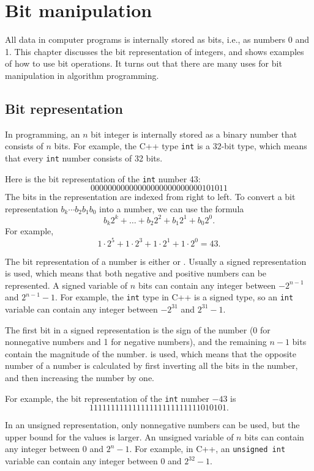\chapter{Bit manipulation}

All data in computer programs is internally stored as bits,
i.e., as numbers 0 and 1.
This chapter discusses the bit representation
of integers, and shows examples
of how to use bit operations.
It turns out that there are many uses for
bit manipulation in algorithm programming.

\section{Bit representation}


In programming, an $n$ bit integer is internally
stored as a binary number that consists of $n$ bits.
For example, the C++ type \texttt{int} is
a 32-bit type, which means that every \texttt{int}
number consists of 32 bits.

Here is the bit representation of
the \texttt{int} number 43: 
\[00000000000000000000000000101011\]
The bits in the representation are indexed from right to left.
To convert a bit representation $b_k \cdots b_2 b_1 b_0$ into a number,
we can use the formula
\[b_k 2^k + \ldots + b_2 2^2 + b_1 2^1 + b_0 2^0.\]
For example,
\[1 \cdot 2^5 + 1 \cdot 2^3 + 1 \cdot 2^1 + 1 \cdot 2^0 = 43.\]

The bit representation of a number is either
 or .
Usually a signed representation is used,
which means that both negative and positive
numbers can be represented.
A signed variable of $n$ bits can contain any
integer between $-2^{n-1}$ and $2^{n-1}-1$.
For example, the \texttt{int} type in C++ is
a signed type, so an \texttt{int} variable can contain any
integer between $-2^{31}$ and $2^{31}-1$.

The first bit in a signed representation
is the sign of the number (0 for nonnegative numbers
and 1 for negative numbers), and
the remaining $n-1$ bits contain the magnitude of the number.
 is used, which means that the
opposite number of a number is calculated by first
inverting all the bits in the number,
and then increasing the number by one.

For example, the bit representation of
the \texttt{int} number $-43$ is
\[11111111111111111111111111010101.\]

In an unsigned representation, only nonnegative
numbers can be used, but the upper bound for the values is larger.
An unsigned variable of $n$ bits can contain any
integer between $0$ and $2^n-1$.
For example, in C++, an \texttt{unsigned int} variable
can contain any integer between $0$ and $2^{32}-1$.

